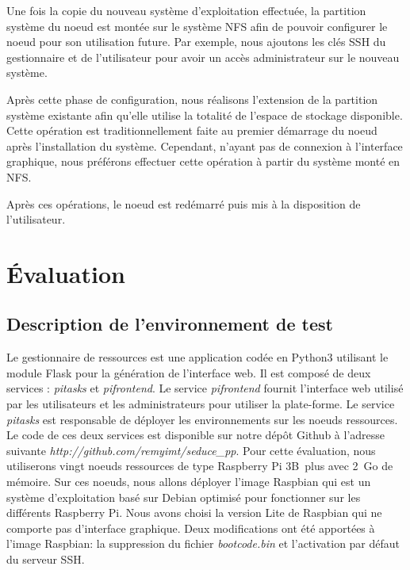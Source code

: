 \documentclass[letterpaper, 10 pt, conference]{ieeeconf}
\begin{document}
Une fois la copie du nouveau système d'exploitation effectuée, la partition système du noeud est montée sur le système NFS afin de pouvoir configurer le noeud pour son utilisation future. Par exemple, nous ajoutons les clés SSH du gestionnaire et de l'utilisateur pour avoir un accès administrateur sur le nouveau système.

Après cette phase de configuration, nous réalisons l'extension de la partition système existante afin qu'elle utilise la totalité de l'espace de stockage disponible. Cette opération est traditionnellement faite au premier démarrage du noeud après l'installation du système. Cependant, n'ayant pas de connexion à l'interface graphique, nous préférons effectuer cette opération à partir du système monté en NFS.

Après ces opérations, le noeud est redémarré puis mis à la disposition de l'utilisateur.

\section{Évaluation}
\label{sec:implementation}

\subsection{Description de l'environnement de test}
Le gestionnaire de ressources est une application codée en Python3 utilisant le module Flask pour la génération de l'interface web. Il est composé de deux services : \textit{pitasks} et \textit{pifrontend}. Le service \textit{pifrontend} fournit l'interface web utilisé par les utilisateurs et les administrateurs pour utiliser la plate-forme. Le service \textit{pitasks} est responsable de déployer les environnements sur les noeuds ressources. Le code de ces deux services est disponible sur notre dépôt Github à l'adresse suivante \textit{http://github.com/remyimt/seduce\_pp}. Pour cette évaluation, nous utiliserons vingt noeuds ressources de type Raspberry Pi 3B~plus avec 2~Go de mémoire. Sur ces noeuds, nous allons déployer l'image Raspbian qui est un système d'exploitation basé sur Debian optimisé pour fonctionner sur les différents Raspberry Pi. Nous avons choisi la version Lite de Raspbian qui ne comporte pas d'interface graphique. Deux modifications ont été apportées à l'image Raspbian: la suppression du fichier \textit{bootcode.bin} et l'activation par défaut du serveur SSH.
\end{document}
